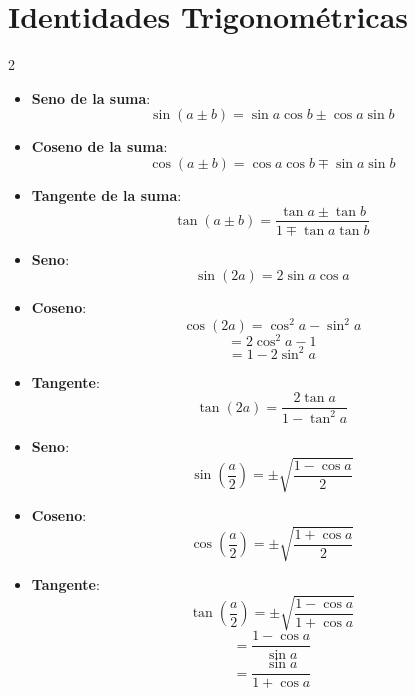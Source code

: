             \section{Identidades Trigonométricas}
            \begin{multicols}{2}

              \begin{itemize}[leftmargin=*,noitemsep,topsep=0pt]
                \item \textbf{Seno de la suma}:
                  \[ \sin(a \pm b) = \sin a \cos b \pm \cos a \sin b \]

                \item \textbf{Coseno de la suma}:
                  \[ \cos(a \pm b) = \cos a \cos b \mp \sin a \sin b \]

                \item \textbf{Tangente de la suma}:
                  \[ \tan(a \pm b) = \dfrac{\tan a \pm \tan b}{1 \mp \tan a \tan b} \]
              \end{itemize}

              \begin{itemize}[leftmargin=*,noitemsep,topsep=0pt]
                \item \textbf{Seno}:
                  \[ \sin(2a) = 2 \sin a \cos a \]

                \item \textbf{Coseno}:
                  \[ \cos(2a) = \cos^2 a - \sin^2 a \]
                  \[ = 2\cos^2 a - 1 \]
                  \[ = 1 - 2\sin^2 a \]

                \item \textbf{Tangente}:
                  \[ \tan(2a) = \dfrac{2\tan a}{1 - \tan^2 a} \]
              \end{itemize}


              \begin{itemize}[leftmargin=*,noitemsep,topsep=0pt]
                \item \textbf{Seno}:
                  \[ \sin\left(\dfrac{a}{2}\right) = \pm \sqrt{\dfrac{1 - \cos a}{2}} \]

                \item \textbf{Coseno}:
                  \[ \cos\left(\dfrac{a}{2}\right) = \pm \sqrt{\dfrac{1 + \cos a}{2}} \]

                \item \textbf{Tangente}:
                  \[ \tan\left(\dfrac{a}{2}\right) = \pm \sqrt{\dfrac{1 - \cos a}{1 + \cos a}} \]
                  \[ = \dfrac{1 - \cos a}{\sin a} \]
                  \[ = \dfrac{\sin a}{1 + \cos a} \]
              \end{itemize}
              \columnbreak


\end{multicols}
